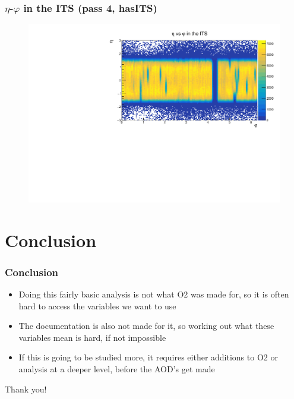 \documentclass[10pt]{beamer}
\begin{document}
\begin{frame}
    \frametitle{$\eta$-$\varphi$ in the ITS (pass 4, hasITS)}
        \begin{figure}
            \begin{center}
                \includegraphics[width=\textwidth]{Plots/pass4_TracksIU/eta_phi.pdf}
            \end{center}
        \end{figure}
\end{frame}


\section{Conclusion}

\begin{frame}
    \frametitle{Conclusion}

    \begin{itemize}
        \item Doing this fairly basic analysis is not what O2 was made for, so it is often hard to access the variables we want to use
        \item The documentation is also not made for it, so working out what these variables mean is hard, if not impossible
        \item If this is going to be studied more, it requires either additions to O2 or analysis at a deeper level, before the AOD's get made
    \end{itemize}

\end{frame}

\begin{frame}
    \begin{center}
        {\Huge Thank you!}
    \end{center}

\end{frame}
\end{document}
